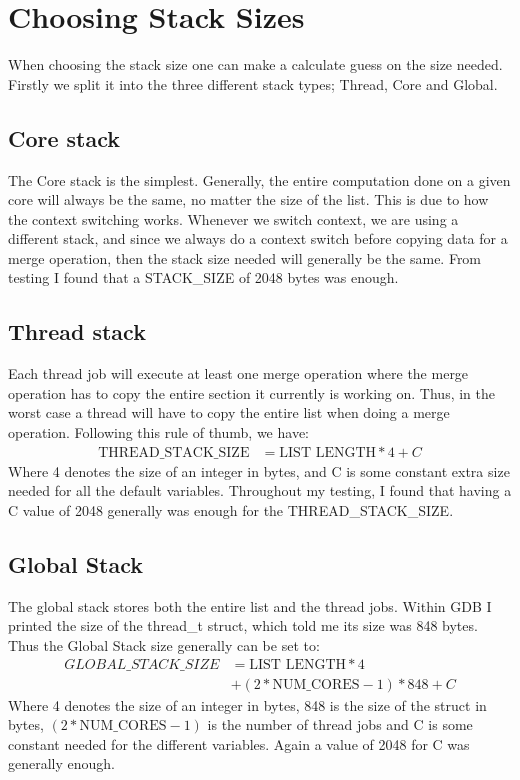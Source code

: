 \section{Choosing Stack Sizes}\label{ap:stack}
When choosing the stack size one can make a calculate guess on the size needed.
Firstly we split it into the three different stack types; Thread, Core and
Global.

\subsection*{Core stack}
The Core stack is the simplest. Generally, the entire computation done on a
given core will always be the same, no matter the size of the list. This is due
to how the context switching works. Whenever we switch context, we are using a
different stack, and since we always do a context switch before copying data for
a merge operation, then the stack size needed will generally be the same. From
testing I found that a STACK\_SIZE of 2048 bytes was enough.

\subsection*{Thread stack}
Each thread job will execute at least one merge operation where the merge
operation has to copy the entire section it currently is working on. Thus, in
the worst case a thread will have to copy the entire list when doing a merge
operation. Following this rule of thumb, we have:
\begin{align}
  \text{THREAD\_STACK\_SIZE} &= \text{LIST LENGTH} * 4 + C
\end{align}
Where 4 denotes the size of an integer in bytes, and C is some constant extra
size needed for all the default variables. Throughout my testing, I found that
having a C value of 2048 generally was enough for the THREAD\_STACK\_SIZE.

\subsection*{Global Stack}
The global stack stores both the entire list and the thread jobs. Within GDB I
printed the size of the thread\_t struct, which told me its size was 848 bytes.
Thus the Global Stack size generally can be set to:
\begin{align}
  GLOBAL\_STACK\_SIZE &= \text{LIST LENGTH} * 4  \\
                      &+ (2 * \text{NUM\_CORES} - 1) * 848  + C
\end{align}
Where 4 denotes the size of an integer in bytes, 848 is the size of the struct
in bytes, $(2 * \text{NUM\_CORES} - 1)$ is the number of thread jobs and C is
some constant needed for the different variables. Again a value of 2048 for C
was generally enough.

